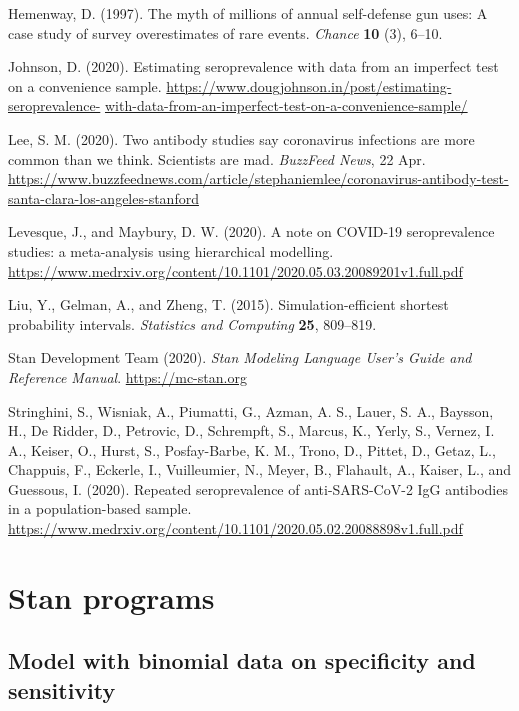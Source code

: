 \documentclass[11pt]{article}
\begin{document}
\bibitem Hemenway, D. (1997).  The myth of millions of annual self-defense gun uses:  A case study of survey overestimates of rare events.  {\em Chance} {\bf 10} (3), 6--10.

\bibitem Johnson, D. (2020).  Estimating seroprevalence with data from an imperfect test on a convenience sample.  {\small \url{https://www.dougjohnson.in/post/estimating-seroprevalence-}} {\small \url{with-data-from-an-imperfect-test-on-a-convenience-sample/}}

\bibitem Lee, S. M. (2020).  Two antibody studies say coronavirus infections are more common than we think. Scientists are mad.  {\em BuzzFeed News}, 22 Apr.  {\small \url{https://www.buzzfeednews.com/article/stephaniemlee/coronavirus-antibody-test-santa-clara-los-angeles-stanford}}

\bibitem Levesque, J., and Maybury, D. W. (2020).  A note on COVID-19 seroprevalence studies: a meta-analysis using hierarchical modelling.  {\small \url{https://www.medrxiv.org/content/10.1101/2020.05.03.20089201v1.full.pdf}}

\bibitem Liu, Y., Gelman, A., and Zheng, T. (2015).  Simulation-efficient shortest probability intervals. {\em Statistics and Computing} {\bf 25}, 809--819.

\bibitem Stan Development Team (2020). {\em Stan Modeling Language User's Guide and Reference Manual}.  {\small \url{https://mc-stan.org}}

\bibitem Stringhini, S., Wisniak, A., Piumatti, G., Azman, A. S., Lauer, S. A., Baysson, H., De Ridder, D., Petrovic, D.,  Schrempft, S., Marcus, K., Yerly, S., Vernez, I. A., Keiser, O., Hurst, S., Posfay-Barbe, K. M., Trono, D., Pittet, D., Getaz, L., Chappuis, F., Eckerle, I., Vuilleumier, N., Meyer, B., Flahault, A., Kaiser, L., and Guessous, I. (2020).  Repeated seroprevalence of anti-SARS-CoV-2 IgG antibodies in a population-based sample.  {\small \url{https://www.medrxiv.org/content/10.1101/2020.05.02.20088898v1.full.pdf}}

\pagebreak
\appendix

\section{Stan programs}

\subsection{Model with binomial data on specificity and sensitivity}\label{stan2}
\end{document}
